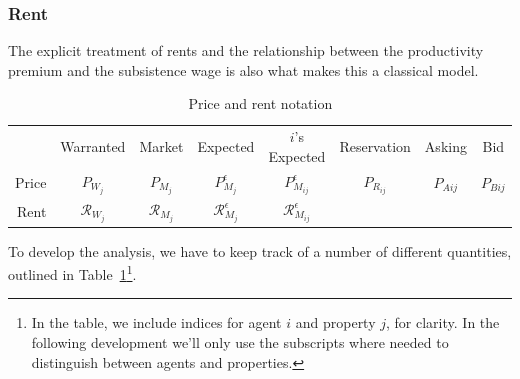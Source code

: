 \subsubsection{Rent} \label{section-rent}
The explicit treatment of rents and the relationship between the productivity \gls{premium} and the \gls{subsistence wage}
is also what makes this a \gls{classical} model. 


\begin{table}[!ht]
\centering
{\renewcommand{\arraystretch}{1.6}
\begin{tabular}{r|c|c|c|c|c|c|c|}\cline{2-8}
       & Warranted  & Market & Expected & $i$'s Expected & Reservation & Asking & Bid     \\ \cline{2-8}
Price  & $P_{W_j}$      & $P_{M_j}$  & $P_{M_j}^\epsilon$ & $P_{M_{ij}}^{\epsilon}$     & $P_{R_{ij}}$       & $P_{A{ij}}$  & $P_{B{ij}}$   \\ \cline{2-8}
Rent  & $\mathcal{R}_{W_j}$      & $\mathcal{R}_{M_j}$  & $\mathcal{R}_{M_j}^\epsilon$ & $\mathcal{R}_{M_{ij}}^{\epsilon}$     &       &   &   \\ \cline{2-8}
\end{tabular}
 }   
\caption{Price and rent notation}
\label{table-price-notation}
\end{table}


To develop the analysis, we have to keep track of a number of different quantities, outlined in Table~\ref{table-price-notation}\footnote{In the table, we include indices for agent $i$ and property $j$, for clarity. In the following development we'll only use the subscripts where needed to distinguish between agents and properties.}. 

